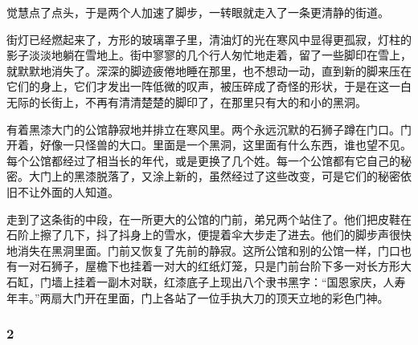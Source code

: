 \par 觉慧点了点头，于是两个人加速了脚步，一转眼就走入了一条更清静的街道。
\par 街灯已经燃起来了，方形的玻璃罩子里，清油灯的光在寒风中显得更孤寂，灯柱的影子淡淡地躺在雪地上。街中寥寥的几个行人匆忙地走着，留了一些脚印在雪上，就默默地消失了。深深的脚迹疲倦地睡在那里，也不想动一动，直到新的脚来压在它们的身上，它们才发出一阵低微的叹声，被压碎成了奇怪的形状，于是在这一白无际的长街上，不再有清清楚楚的脚印了，在那里只有大的和小的黑洞。
\par 有着黑漆大门的公馆静寂地并排立在寒风里。两个永远沉默的石狮子蹲在门口。门开着，好像一只怪兽的大口。里面是一个黑洞，这里面有什么东西，谁也望不见。每个公馆都经过了相当长的年代，或是更换了几个姓。每一个公馆都有它自己的秘密。大门上的黑漆脱落了，又涂上新的，虽然经过了这些改变，可是它们的秘密依旧不让外面的人知道。
\par 走到了这条街的中段，在一所更大的公馆的门前，弟兄两个站住了。他们把皮鞋在石阶上擦了几下，抖了抖身上的雪水，便提着伞大步走了进去。他们的脚步声很快地消失在黑洞里面。门前又恢复了先前的静寂。这所公馆和别的公馆一样，门口也有一对石狮子，屋檐下也挂着一对大的红纸灯笼，只是门前台阶下多一对长方形大石缸，门墙上挂着一副木对联，红漆底子上现出八个隶书黑字：“国恩家庆，人寿年丰。”两扇大门开在里面，门上各站了一位手执大刀的顶天立地的彩色门神。


\subsubsection*{2}


